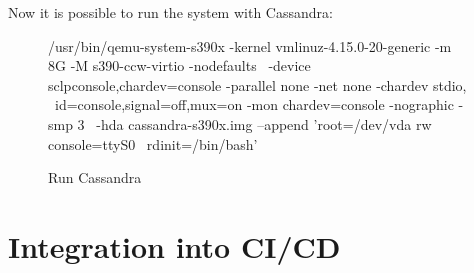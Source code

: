 Now it is possible to run the system with Cassandra: \\
\begin{figure}[H]
\centering
\begin{boxedverbatim}
 /usr/bin/qemu-system-s390x -kernel vmlinuz-4.15.0-20-generic -m 8G -M s390-ccw-virtio -nodefaults \
 -device sclpconsole,chardev=console -parallel none -net none -chardev stdio, \
 id=console,signal=off,mux=on -mon chardev=console -nographic -smp 3 \
 -hda cassandra-s390x.img --append 'root=/dev/vda rw console=ttyS0 \
 rdinit=/bin/bash' 
\end{boxedverbatim}
 \caption{Run Cassandra}
    \label{RunCassandra}
\end{figure}

\newpage
\section{Integration into CI/CD}

